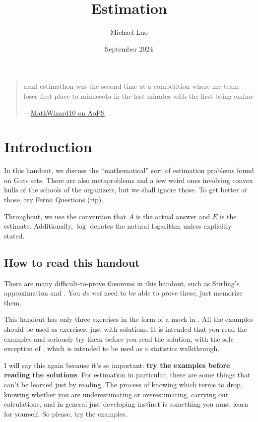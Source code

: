 \documentclass[11pt]{scrartcl}
\title{Estimation}
\author{Michael Luo}
\date{September 2024}
\begin{document}
\maketitle

\begin{quote}
	\sffamily\small
	arml estimathon was the second time at a competition where my team loses first place to minnesota in the last  minutes with the first being cmimc

	\medskip

	---\href{https://artofproblemsolving.com/community/q3h3332858p30875431}{MathWizard10 on AoPS}
\end{quote}

\tableofcontents

\section{Introduction}

In this handout, we discuss the ``mathematical'' sort of estimation problems found on Guts sets. There are also metaproblems and a few weird ones involving convex hulls of the schools of the organizers, but we shall ignore those. To get better at those, try Fermi Questions (rip).

Throughout, we use the convention that $A$ is the actual answer and $E$ is the estimate. Additionally, $\log$ denotes the natural logarithm unless explicitly stated.

\subsection{How to read this handout}

There are many difficult-to-prove theorems in this handout, such as Stirling's approximation and . You \emph{do not} need to be able to prove these, just memorize them.

This handout has only three exercises in the form of a mock in . All the examples should be used as exercises, just with solutions. It is intended that you read the examples and seriously try them before you read the solution, with the sole exception of , which is intended to be used as a statistics walkthrough.

I will say this again because it's so important: \textbf{try the examples before reading the solutions}. For estimation in particular, there are some things that can't be learned just by reading. The process of knowing which terms to drop, knowing whether you are underestimating or overestimating, carrying out calculations, and in general just developing instinct is something you must learn for yourself. So please, try the examples.
\end{document}
